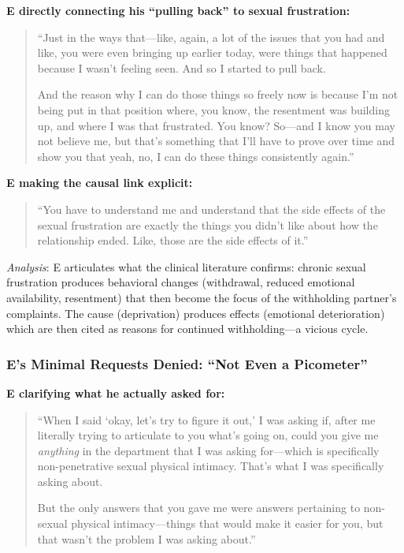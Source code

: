 \documentclass[12pt, letterpaper]{article}
\begin{document}
\textbf{E directly connecting his ``pulling back'' to sexual frustration:}
\begin{quote}
``Just in the ways that---like, again, a lot of the issues that you had and like, you were even bringing up earlier today, were things that happened because I wasn't feeling seen. And so I started to pull back.

And the reason why I can do those things so freely now is because I'm not being put in that position where, you know, the resentment was building up, and where I was that frustrated. You know? So---and I know you may not believe me, but that's something that I'll have to prove over time and show you that yeah, no, I can do these things consistently again.''
\end{quote}

\textbf{E making the causal link explicit:}
\begin{quote}
``You have to understand me and understand that the side effects of the sexual frustration are exactly the things you didn't like about how the relationship ended. Like, those are the side effects of it.''
\end{quote}

\textit{Analysis}: E articulates what the clinical literature confirms: chronic sexual frustration produces behavioral changes (withdrawal, reduced emotional availability, resentment) that then become the focus of the withholding partner's complaints. The cause (deprivation) produces effects (emotional deterioration) which are then cited as reasons for continued withholding---a vicious cycle.

\subsubsection{E's Minimal Requests Denied: ``Not Even a Picometer''}

\textbf{E clarifying what he actually asked for:}
\begin{quote}
``When I said `okay, let's try to figure it out,' I was asking if, after me literally trying to articulate to you what's going on, could you give me \textit{anything} in the department that I was asking for---which is specifically non-penetrative sexual physical intimacy. That's what I was specifically asking about.

But the only answers that you gave me were answers pertaining to non-sexual physical intimacy---things that would make it easier for you, but that wasn't the problem I was asking about.''
\end{quote}
\end{document}

